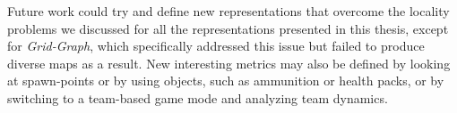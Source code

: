 Future work could try and define new representations that overcome the locality problems we discussed for all the representations presented in this thesis, except for \textit{Grid-Graph}, which specifically addressed this issue but failed to produce diverse maps as a result. New interesting metrics may also be defined by looking at spawn-points or by using objects, such as ammunition or health packs, or by switching to a team-based game mode and analyzing team dynamics.  

